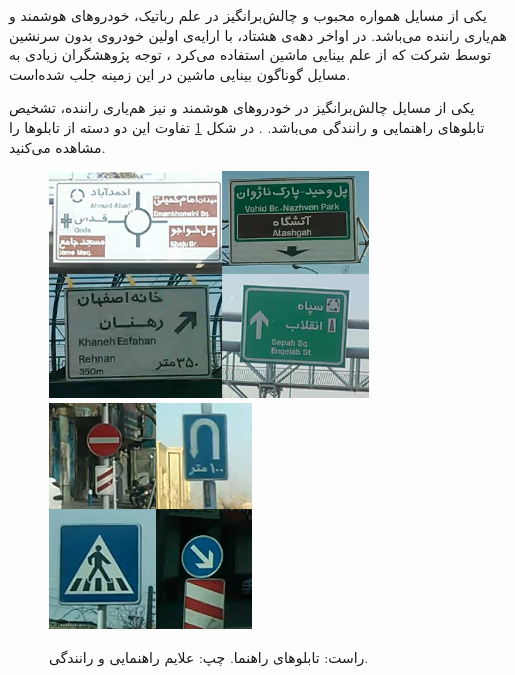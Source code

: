 
\pagebreak

یکی از مسایل همواره محبوب و چالش‌برانگیز در علم رباتیک، خودروهای هوشمند و هم‌یاری راننده می‌باشد. در اواخر دهه‌ی هشتاد، با ارایه‌ی اولین خودروی بدون سرنشین توسط شرکت  که از علم بینایی ماشین استفاده می‌کرد
، توجه پژوهشگران زیادی به مسایل گوناگون بینایی ماشین در این زمینه جلب شده‌است. 

یکی از مسایل چالش‌برانگیز در خودروهای هوشمند و نیز هم‌یاری راننده‌، تشخیص تابلوهای راهنمایی و رانندگی می‌باشد. \cite{Gonzalez2014}. در شکل
\ref{fig:signs} 
 تفاوت این دو دسته از تابلوها را مشاهده می‌کنید.


\begin{figure}[t]
\centering
    	\includegraphics[height=6cm]{Figures/Panels.png}
	   	\includegraphics[height=6cm]{Figures/Signs.png}
\caption[تابلوی راهنما و علایم رانندگی]{راست: تابلوهای راهنما. چپ: علایم راهنمایی و رانندگی. }
\label{fig:signs}
\end{figure}

